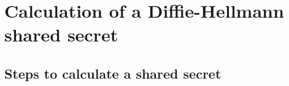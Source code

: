 \chapter{Calculation of a Diffie-Hellmann shared secret}

\section{Steps to calculate a shared secret}